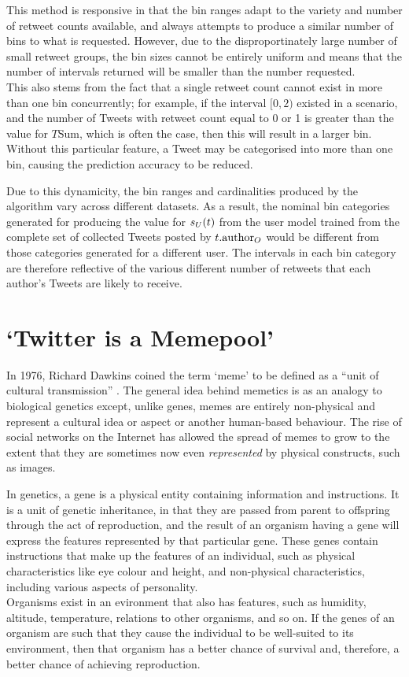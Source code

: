 This method is responsive in that the bin ranges adapt to the variety and number of retweet counts available, and always attempts to produce a similar number of bins to what is requested. However, due to the disproportinately large number of small retweet groups, the bin sizes cannot be entirely uniform and means that the number of intervals returned will be smaller than the number requested.\\
This also stems from the fact that a single retweet count cannot exist in more than one bin concurrently; for example, if the interval $[0,2)$ existed in a scenario, and the number of Tweets with retweet count equal to 0 or 1 is greater than the value for $T\textrm{Sum}$, which is often the case, then this will result in a larger bin. Without this particular feature, a Tweet may be categorised into more than one bin, causing the prediction accuracy to be reduced. 

Due to this dynamicity, the bin ranges and cardinalities produced by the algorithm vary across different datasets. As a result, the nominal bin categories generated for producing the value for $s_U(t)$ from the user model trained from the complete set of collected Tweets posted by $t.\textrm{author}_O$ would be different from those categories generated for a different user. The intervals in each bin category are therefore reflective of the various different number of retweets that each author's Tweets are likely to receive. 


\section{`Twitter is a Memepool'}
In 1976, Richard Dawkins coined the term `meme' to be defined as a ``unit of cultural transmission'' \cite{dawkins76}. The general idea behind memetics is as an analogy to biological genetics except, unlike genes, memes are entirely non-physical and represent a cultural idea or aspect or another human-based behaviour. The rise of social networks on the Internet has allowed the spread of memes to grow to the extent that they are sometimes now even \textit{represented} by physical constructs, such as images.

In genetics, a gene is a physical entity containing information and instructions. It is a unit of genetic inheritance, in that they are passed from parent to offspring through the act of reproduction, and the result of an organism having a gene will express the features represented by that particular gene. These genes contain instructions that make up the features of an individual, such as physical characteristics like eye colour and height, and non-physical characteristics, including various aspects of personality.\\
Organisms exist in an evironment that also has features, such as humidity, altitude, temperature, relations to other organisms, and so on. If the genes of an organism are such that they cause the individual to be well-suited to its environment, then that organism has a better chance of survival and, therefore, a better chance of achieving reproduction.

